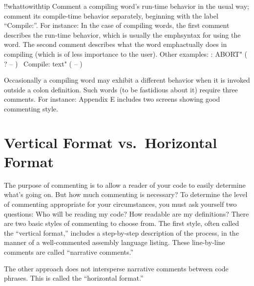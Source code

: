 !!whattowithtip{
Comment a compiling word's run-time behavior in the usual way; comment
its compile-time behavior separately, beginning with the label ``Compile:''.
}
For instance:
In the case of compiling words, the first comment describes the run-time
behavior, which is usually the emph{syntax for using} the word.  The second comment
describes what the word emph{actually does} in compiling (which is of less
importance to the user).
Other examples:
: ABORT"  ( ? -- )
\ Compile:    text"   ( -- )

Occasionally a compiling word may exhibit a different behavior when it is
invoked outside a colon definition.  Such words (to be fastidious about it)
require three comments.  For instance:
Appendix E includes two screens showing good commenting style.

\section{Vertical Format vs.\ Horizontal Format}

The purpose of commenting is to allow a reader of your code to easily
determine what's going on.  But how much commenting is necessary? To
determine the level of commenting appropriate for your circumstances,
you must ask yourself two questions:
Who will be reading my code?
How readable are my definitions?
There are two basic styles of commenting to choose from.  The first style,
often called the ``vertical format,'' includes a step-by-step description of
the process, in the manner of a well-commented assembly language
listing.  These line-by-line comments are called ``narrative comments.''

The other approach does not intersperse narrative comments between
code phrases.  This is called the ``horizontal format.''

